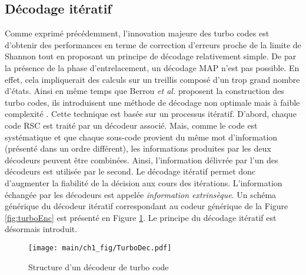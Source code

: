 \subsection{Décodage itératif}
Comme exprimé précédemment, l'innovation majeure des turbo codes est d'obtenir des performances en terme de correction 
d'erreurs proche de la limite de Shannon tout en proposant un principe de décodage relativement simple. De par la présence 
de la phase d'entrelacement, un décodage MAP n'est pas possible. En effet, cela impliquerait des calculs sur un treillis 
composé d'un trop grand nombre d'états. Ainsi en même temps que Berrou \textit{et al.} proposent la construction des turbo 
codes, ils introduisent une méthode de décodage non optimale mais à faible complexité \cite{berrouTC}. Cette technique est 
basée sur un processus itératif. D'abord, chaque code RSC est traité par un décodeur associé. Mais, comme le code est systématique 
et que chaque sous-code provient du même mot d'information (présenté dans un ordre différent), les informations produites 
par les deux décodeurs peuvent être combinées. Ainsi, l'information délivrée par l'un des décodeurs est utilisée par le 
second. Le décodage itératif permet donc d'augmenter la fiabilité de la décision aux cours des itérations. L'information 
échangée par les décodeurs est appelée \emph{information extrinsèque}. Un schéma générique du décodeur itératif correspondant 
au codeur générique de la Figure \ref{fig:turboEnc} est présenté en Figure \ref{fig:turboDec}. Le principe du décodage itératif 
est désormais introduit.

\begin{figure}[!h]
	\centering
	\texttt{[image: main/ch1\_fig/TurboDec.pdf]}
	\caption{\label{fig:turboDec} Structure d'un décodeur de turbo code}
\end{figure}

%
	
	

